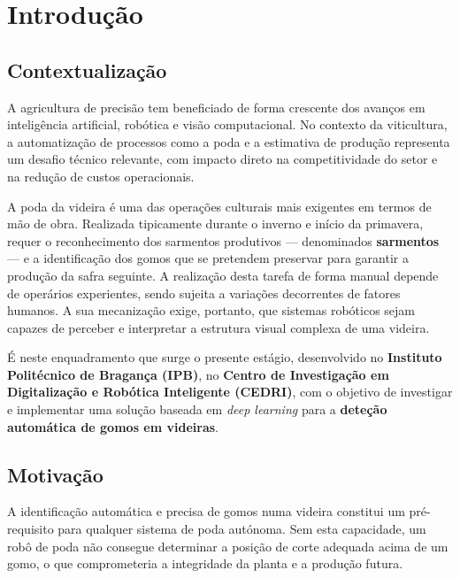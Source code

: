 \chapter{Introdução}
\label{chap:introducao}

\section{Contextualização}

A agricultura de precisão tem beneficiado de forma crescente dos avanços em
inteligência artificial, robótica e visão computacional. No contexto da
viticultura, a automatização de processos como a poda e a estimativa de
produção representa um desafio técnico relevante, com impacto direto na
competitividade do setor e na redução de custos operacionais.

A poda da videira é uma das operações culturais mais exigentes em termos de
mão de obra. Realizada tipicamente durante o inverno e início da primavera,
requer o reconhecimento dos sarmentos produtivos — denominados
\textbf{sarmentos} — e a identificação dos gomos que se pretendem preservar
para garantir a produção da safra seguinte. A realização desta tarefa de forma
manual depende de operários experientes, sendo sujeita a variações decorrentes
de fatores humanos. A sua mecanização exige, portanto, que sistemas robóticos
sejam capazes de perceber e interpretar a estrutura visual complexa de uma
videira.

É neste enquadramento que surge o presente estágio, desenvolvido no
\textbf{Instituto Politécnico de Bragança (IPB)}, no \textbf{Centro de
Investigação em Digitalização e Robótica Inteligente (CEDRI)}, com o objetivo
de investigar e implementar uma solução baseada em \textit{deep learning}
para a \textbf{deteção automática de gomos em videiras}.

\section{Motivação}

A identificação automática e precisa de gomos numa videira constitui um pré-
requisito para qualquer sistema de poda autónoma. Sem esta capacidade, um
robô de poda não consegue determinar a posição de corte adequada acima de
um gomo, o que comprometeria a integridade da planta e a produção futura.

